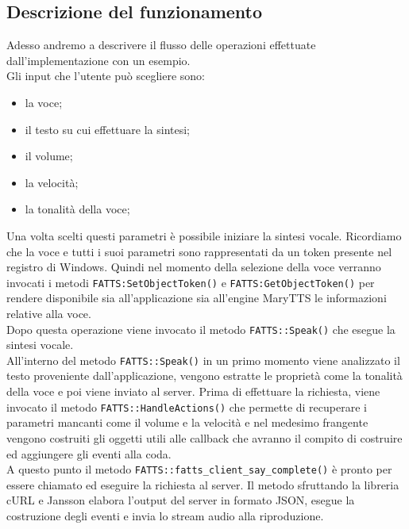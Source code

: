 \subsection{Descrizione del funzionamento}
Adesso andremo a descrivere il flusso delle operazioni effettuate dall'implementazione con un esempio.\\
Gli input che l'utente può scegliere sono:
\begin{itemize}
	\item la voce;
	\item il testo su cui effettuare la sintesi;
	\item il volume;
	\item la velocità;
	\item la tonalità della voce;
\end{itemize}
Una volta scelti questi parametri è possibile iniziare la sintesi vocale. Ricordiamo che la voce e tutti i suoi parametri sono rappresentati da un token presente nel registro di Windows.
Quindi nel momento della selezione della voce verranno invocati i metodi \texttt{FATTS:SetObjectToken()} e \texttt{FATTS:GetObjectToken()} per rendere disponibile sia all'applicazione sia all'engine MaryTTS le informazioni relative alla voce.\\
Dopo questa operazione viene invocato il metodo \texttt{FATTS::Speak()} che esegue la sintesi vocale.\\
All'interno del metodo \texttt{FATTS::Speak()} in un primo momento viene analizzato il testo proveniente dall'applicazione, vengono estratte le proprietà come la tonalità della voce e poi viene inviato al server.
Prima di effettuare la richiesta, viene invocato il metodo \texttt{FATTS::HandleActions()} che permette di recuperare i parametri mancanti come il volume e la velocità e nel medesimo frangente vengono costruiti gli oggetti utili alle callback che avranno il compito di costruire ed aggiungere gli eventi alla coda.\\
A questo punto il metodo \texttt{FATTS::fatts\_client\_say\_complete()} è pronto per essere chiamato ed eseguire la richiesta al server.
Il metodo sfruttando la libreria cURL e Jansson elabora l'output del server in formato JSON, esegue la costruzione degli eventi e invia lo stream audio alla riproduzione.

\newpage
